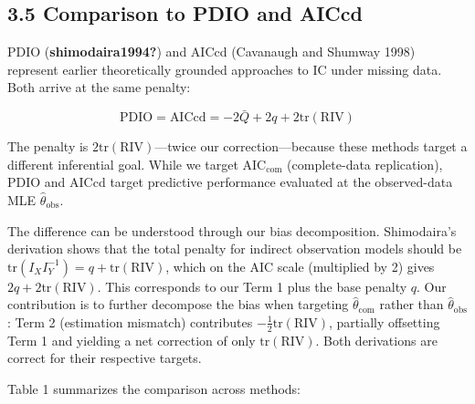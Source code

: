 \documentclass[
]{article}
\begin{document}
\subsection{3.5 Comparison to PDIO and
AICcd}\label{comparison-to-pdio-and-aiccd}

PDIO (\textbf{shimodaira1994?}) and AICcd (Cavanaugh and Shumway 1998)
represent earlier theoretically grounded approaches to IC under missing
data. Both arrive at the same penalty:

\[\text{PDIO} = \text{AICcd} = -2\bar{Q} + 2q + 2\text{tr}(\text{RIV})\]

The penalty is \(2\text{tr}(\text{RIV})\)---twice our
correction---because these methods target a different inferential goal.
While we target \(\text{AIC}_{\text{com}}\) (complete-data replication),
PDIO and AICcd target predictive performance evaluated at the
observed-data MLE \(\hat{\theta}_{\text{obs}}\).

The difference can be understood through our bias decomposition.
Shimodaira's derivation shows that the total penalty for indirect
observation models should be
\(\text{tr}(I_X I_Y^{-1}) = q + \text{tr}(\text{RIV})\), which on the
AIC scale (multiplied by 2) gives \(2q + 2\text{tr}(\text{RIV})\). This
corresponds to our Term 1 plus the base penalty \(q\). Our contribution
is to further decompose the bias when targeting
\(\hat{\theta}_{\text{com}}\) rather than \(\hat{\theta}_{\text{obs}}\):
Term 2 (estimation mismatch) contributes
\(-\frac{1}{2}\text{tr}(\text{RIV})\), partially offsetting Term 1 and
yielding a net correction of only \(\text{tr}(\text{RIV})\). Both
derivations are correct for their respective targets.

Table 1 summarizes the comparison across methods:
\end{document}
